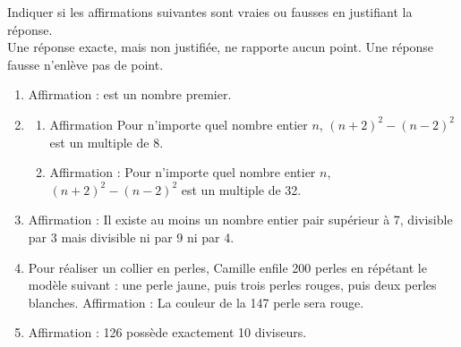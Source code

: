 \begin{exercice}[CRPE 2017 G1-G3 et 2018 G3] %
   Indiquer si les affirmations suivantes sont vraies ou fausses en justifiant la réponse. \\
   Une réponse exacte, mais non justifiée, ne rapporte aucun point. Une réponse fausse n’enlève pas de point.
   \begin{enumerate}
      \item Affirmation :  est un nombre premier. \fg
      \item 
      \begin{enumerate}
         \item Affirmation \og Pour n’importe quel nombre entier $n$, $(n+2)^2 - (n-2)^2$ est un
multiple de 8. \fg
         \item Affirmation : \og Pour n’importe quel nombre entier $n$, $(n+2)^2 - (n-2)^2$ est un
multiple de 32. \fg
      \end{enumerate}
      \item Affirmation : \og Il existe au moins un nombre entier pair supérieur à 7, divisible par 3
mais divisible ni par 9 ni par 4. \fg
      \item Pour réaliser un collier en perles, Camille enfile 200 perles en répétant le modèle suivant : une perle jaune, puis trois perles rouges, puis deux perles blanches. Affirmation : La couleur de la 147 perle sera rouge.
      \item Affirmation : 126 possède exactement 10 diviseurs.
   \end{enumerate}
\end{exercice}

